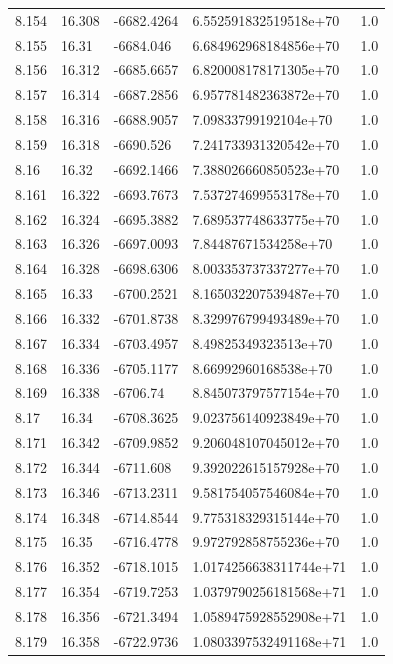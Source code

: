 \begin{tabular}{lllll}
8.154 & 16.308 & -6682.4264 & 6.552591832519518e+70 & 1.0 \\
8.155 & 16.31 & -6684.046 & 6.684962968184856e+70 & 1.0 \\
8.156 & 16.312 & -6685.6657 & 6.820008178171305e+70 & 1.0 \\
8.157 & 16.314 & -6687.2856 & 6.957781482363872e+70 & 1.0 \\
8.158 & 16.316 & -6688.9057 & 7.09833799192104e+70 & 1.0 \\
8.159 & 16.318 & -6690.526 & 7.241733931320542e+70 & 1.0 \\
8.16 & 16.32 & -6692.1466 & 7.388026660850523e+70 & 1.0 \\
8.161 & 16.322 & -6693.7673 & 7.537274699553178e+70 & 1.0 \\
8.162 & 16.324 & -6695.3882 & 7.689537748633775e+70 & 1.0 \\
8.163 & 16.326 & -6697.0093 & 7.84487671534258e+70 & 1.0 \\
8.164 & 16.328 & -6698.6306 & 8.003353737337277e+70 & 1.0 \\
8.165 & 16.33 & -6700.2521 & 8.165032207539487e+70 & 1.0 \\
8.166 & 16.332 & -6701.8738 & 8.329976799493489e+70 & 1.0 \\
8.167 & 16.334 & -6703.4957 & 8.49825349323513e+70 & 1.0 \\
8.168 & 16.336 & -6705.1177 & 8.66992960168538e+70 & 1.0 \\
8.169 & 16.338 & -6706.74 & 8.845073797577154e+70 & 1.0 \\
8.17 & 16.34 & -6708.3625 & 9.023756140923849e+70 & 1.0 \\
8.171 & 16.342 & -6709.9852 & 9.206048107045012e+70 & 1.0 \\
8.172 & 16.344 & -6711.608 & 9.392022615157928e+70 & 1.0 \\
8.173 & 16.346 & -6713.2311 & 9.581754057546084e+70 & 1.0 \\
8.174 & 16.348 & -6714.8544 & 9.775318329315144e+70 & 1.0 \\
8.175 & 16.35 & -6716.4778 & 9.972792858755236e+70 & 1.0 \\
8.176 & 16.352 & -6718.1015 & 1.0174256638311744e+71 & 1.0 \\
8.177 & 16.354 & -6719.7253 & 1.0379790256181568e+71 & 1.0 \\
8.178 & 16.356 & -6721.3494 & 1.0589475928552908e+71 & 1.0 \\
8.179 & 16.358 & -6722.9736 & 1.0803397532491168e+71 & 1.0 \\

\end{tabular}
